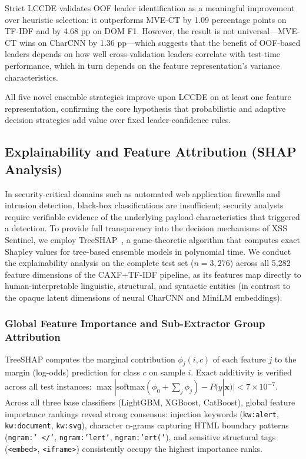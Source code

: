 \documentclass[11pt,a4paper]{article}
\begin{document}
Strict LCCDE validates OOF leader identification as a meaningful improvement over heuristic
selection: it outperforms MVE-CT by 1.09 percentage points on TF-IDF and by 4.68 pp on DOM F1.
However, the result is not universal---MVE-CT wins on CharCNN by 1.36 pp---which suggests that
the benefit of OOF-based leaders depends on how well cross-validation leaders correlate with
test-time performance, which in turn depends on the feature representation's variance characteristics.

All five novel ensemble strategies improve upon LCCDE on at least one feature representation,
confirming the core hypothesis that probabilistic and adaptive decision strategies add value over
fixed leader-confidence rules.

\subsection{Explainability and Feature Attribution (SHAP Analysis)}
\label{ssec:explainability}

In security-critical domains such as automated web application firewalls and intrusion detection,
black-box classifications are insufficient; security analysts require verifiable evidence of the
underlying payload characteristics that triggered a detection. To provide full transparency into the
decision mechanisms of XSS Sentinel, we employ TreeSHAP~\cite{lundberg2017,treeshap2020}, a game-theoretic
algorithm that computes exact Shapley values for tree-based ensemble models in polynomial time.
We conduct the explainability analysis on the complete test set ($n=3{,}276$) across all 5,282 feature
dimensions of the CAXF+TF-IDF pipeline, as its features map directly to human-interpretable linguistic,
structural, and syntactic entities (in contrast to the opaque latent dimensions of neural CharCNN and MiniLM embeddings).

\subsubsection{Global Feature Importance and Sub-Extractor Group Attribution}

TreeSHAP computes the marginal contribution $\phi_j(i, c)$ of each feature $j$ to the margin (log-odds)
prediction for class $c$ on sample $i$. Exact additivity is verified across all test instances:
$\max |\text{softmax}(\phi_0 + \sum_j \phi_j) - P(y|\mathbf{x})| < 7 \times 10^{-7}$.
Across all three base classifiers (LightGBM, XGBoost, CatBoost), global feature importance rankings reveal
strong consensus: injection keywords (\texttt{kw:alert}, \texttt{kw:document}, \texttt{kw:svg}), character
n-grams capturing HTML boundary patterns (\texttt{ngram:' </'}, \texttt{ngram:'lert'}, \texttt{ngram:'ert('}),
and sensitive structural tags (\texttt{<embed>}, \texttt{<iframe>}) consistently occupy the highest importance ranks.
\end{document}
